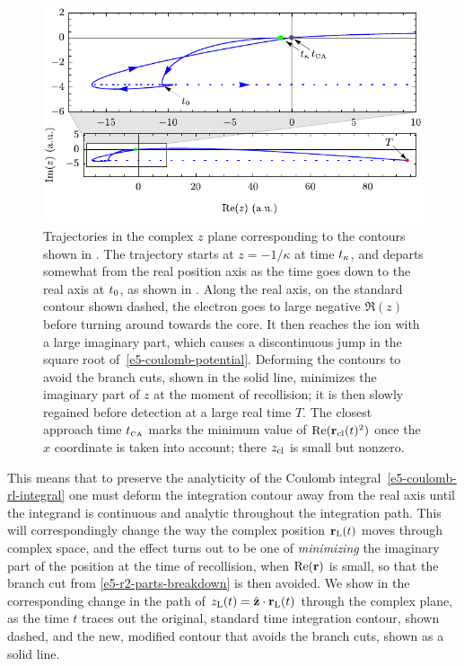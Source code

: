\begin{figure}[t!]
  \centering
  \includegraphics[scale=1]{5-Quantum-orbits/Figures/figure5E.pdf}
  \caption[
  Complex-space trajectory $\zcl(t)$ corresponding to an integration path altered to avoid a Coulomb branch cut
  ]{
  Trajectories in the complex $z$ plane corresponding to the contours shown in . The trajectory starts at $z=-1/\kappa$ at time ${t_\kappa}$, and departs somewhat from the real position axis as the time goes down to the real axis at ${t_0}$, as shown in . Along the real axis, on the standard contour shown dashed, the electron goes to large negative $\Re(z)$ before turning around towards the core. It then reaches the ion with a large imaginary part, which causes a discontinuous jump in the square root of~\eqref{e5-coulomb-potential}. Deforming the contours to avoid the branch cuts, shown in the solid line, minimizes the imaginary part of $z$ at the moment of recollision; it is then slowly regained before detection at a large real time $T$. The closest approach time ${t_{\scriptscriptstyle\mathrm{CA}}}$ marks the minimum value of $\Re(\vb{r}_{\mathrm{cl}}(t)^2)$ once the $x$ coordinate is taken into account; there $z_{\mathrm{cl}}$ is small but nonzero.
  }
  \label{f5-complex-z-curved-contours}
\end{figure}



This means that to preserve the analyticity of the Coulomb integral~\eqref{e5-coulomb-rl-integral} one must deform the integration contour away from the real axis until the integrand is continuous and analytic throughout the integration path. This will correspondingly change the way the complex position $\vb{r}_\mathrm{L}(t)$ moves through complex space, and the effect turns out to be one of \textit{minimizing} the imaginary part of the position at the time of recollision, when $\Re(\vb{r})$ is small, so that the branch cut from \eqref{e5-r2-parts-breakdown} is then avoided. We show in  the corresponding change in the path of ${z_\mathrm{L}}(t)=\hat{\vb{z}}\cdot\vb{r}_\mathrm{L}(t)$ through the complex plane, as the time $t$ traces out the original, standard time integration contour, shown dashed, and the new, modified contour that avoids the branch cuts, shown as a solid line.


